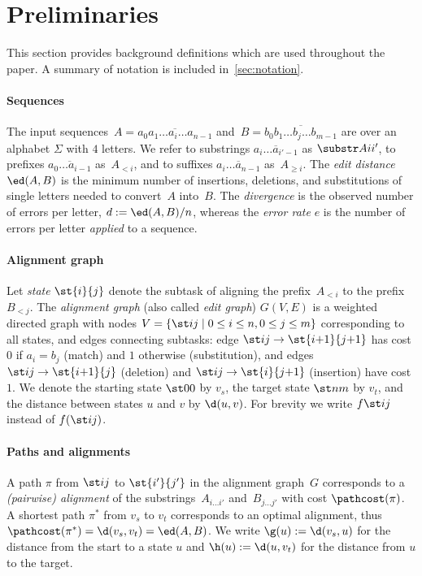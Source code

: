 \section{Preliminaries}\label{sec:preliminaries}

This section provides background definitions which are used throughout the
paper. A summary of notation is included in~\cref{sec:notation}.

\paragraph{Sequences}
The input sequences~$A = \overline{a_0a_1\dots a_i \dots a_{n-1}}$ and~$B =
\overline{b_0b_1 \dots b_j \dots b_{m-1}}$ are over an alphabet $\Sigma$ with
$4$ letters. We refer to substrings $\overline{a_i \dots a_{i'-1}}$ as
$\substr Ai{i'}$, to prefixes $\overline{a_0 \dots a_{i-1}}$ as~$A_{<i}$, and to
suffixes $\overline{a_i \dots a_{n-1}}$ as~$A_{\geq i}$. The \emph{edit
distance} $\ed(A,B)$ is the minimum number of insertions, deletions, and
substitutions of single letters needed to convert~$A$ into~$B$.  The
\emph{divergence} is the observed number of errors per letter, $d:=\ed(A,B)/n$,
whereas the \emph{error rate} $e$ is the number of errors per letter \emph{applied}
to a sequence.

\paragraph{Alignment graph}
Let \emph{state} $\st{i}{j}$ denote the subtask of aligning the prefix~$A_{<i}$
to the prefix~$B_{<j}$. The \emph{alignment graph} (also called \emph{edit
graph}) $G(V,E)$ is a weighted directed graph with nodes $V = \{\st ij \mid
{0\leq i \leq n}, {0\leq j\leq m}\}$ corresponding to all states, and edges
connecting subtasks: edge ${\st ij \to \st{i{+}1}{j{+}1}}$ has cost $0$ if ${a_i
= b_j}$ (match) and $1$ otherwise (substitution), and edges ${\st ij \to
\st{i{+}1}{j}}$ (deletion) and ${\st ij \to\st{i}{j{+}1}}$ (insertion) have cost
$1$. We denote the starting state $\st 00$ by $v_s$, the target state $\st nm$ by
$v_t$, and the distance between states $u$ and $v$ by $\d(u,v)$. For brevity we
write $f \st ij$ instead of $f(\st ij)$.

\paragraph{Paths and alignments}
A path $\pi$ from $\st ij$ to $\st{i'}{j'}$ in the alignment graph~$G$
corresponds to a \emph{(pairwise) alignment} of the substrings~$A_{i \dots i'}$
and~$B_{j \dots j'}$ with cost $\pathcost(\pi)$. A shortest path $\pi^*$ from
$v_s$ to $v_t$ corresponds to an optimal alignment, thus $\pathcost(\pi^*) =
\d(v_s, v_t) = \ed(A, B)$. We write $\g(u) := \d(v_s, u)$ for the distance from
the start to a state $u$ and $\h(u) := \d(u, v_t)$ for the distance from $u$ to
the target.

